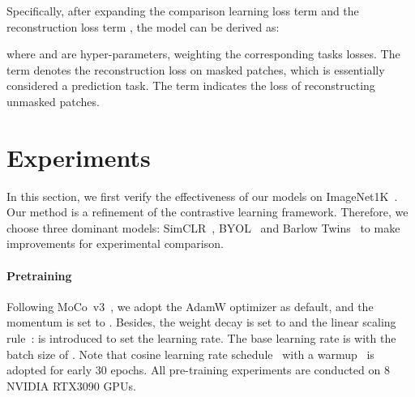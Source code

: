 \documentclass[10pt,twocolumn,letterpaper]{article}
\begin{document}
Specifically, after expanding the comparison learning loss term  and the reconstruction loss term , the model can be derived as:

where  and  are hyper-parameters, weighting the corresponding tasks losses.
The term  denotes the reconstruction loss on masked patches, which is essentially considered a prediction task. The term  indicates the loss of reconstructing unmasked patches.

\section{Experiments}
In this section, we first verify the effectiveness of our models on ImageNet1K~\cite{deng2009imagenet}. Our method is a refinement of the contrastive learning framework. Therefore, we choose three dominant models: SimCLR~\cite{chen2020simple}, BYOL~\cite{grill2020bootstrap} and Barlow Twins~\cite{zbontar2021barlow} to make improvements for experimental comparison.

\paragraph{Pretraining} Following MoCo~v3~\cite{chen2021empirical}, we adopt the AdamW optimizer as default, and the momentum is set to . Besides, the weight decay is set to  and the linear scaling rule~\cite{goyal2017accurate}:  is introduced to set the learning rate. The base learning rate  is  with the batch size of . Note that cosine learning rate schedule~\cite{loshchilov2016sgdr} with a warmup~\cite{goyal2017accurate} is adopted for early 30 epochs. All pre-training experiments are conducted on 8 NVIDIA RTX3090 GPUs.
\end{document}
